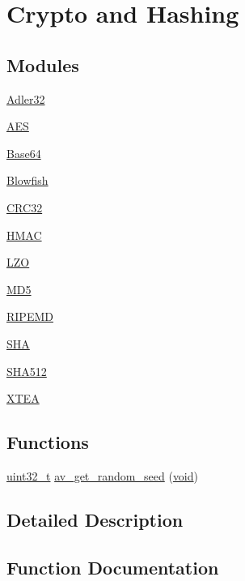 \hypertarget{group__lavu__crypto}{}\section{Crypto and Hashing}
\label{group__lavu__crypto}
\subsection*{Modules}
\begin{DoxyCompactItemize}
\item 
\hyperlink{group__lavu__adler32}{Adler32}
\item 
\hyperlink{group__lavu__aes}{A\+ES}
\item 
\hyperlink{group__lavu__base64}{Base64}
\item 
\hyperlink{group__lavu__blowfish}{Blowfish}
\item 
\hyperlink{group__lavu__crc32}{C\+R\+C32}
\item 
\hyperlink{group__lavu__hmac}{H\+M\+AC}
\item 
\hyperlink{group__lavu__lzo}{L\+ZO}
\item 
\hyperlink{group__lavu__md5}{M\+D5}
\item 
\hyperlink{group__lavu__ripemd}{R\+I\+P\+E\+MD}
\item 
\hyperlink{group__lavu__sha}{S\+HA}
\item 
\hyperlink{group__lavu__sha512}{S\+H\+A512}
\item 
\hyperlink{group__lavu__xtea}{X\+T\+EA}
\end{DoxyCompactItemize}
\subsection*{Functions}
\begin{DoxyCompactItemize}
\item 
\hyperlink{lib-src_2ffmpeg_2win32_2stdint_8h_a6eb1e68cc391dd753bc8ce896dbb8315}{uint32\+\_\+t} \hyperlink{group__lavu__crypto_ga4fe662789c7e05a6b63e0c675dbbd7ed}{av\+\_\+get\+\_\+random\+\_\+seed} (\hyperlink{sound_8c_ae35f5844602719cf66324f4de2a658b3}{void})
\end{DoxyCompactItemize}


\subsection{Detailed Description}


\subsection{Function Documentation}
